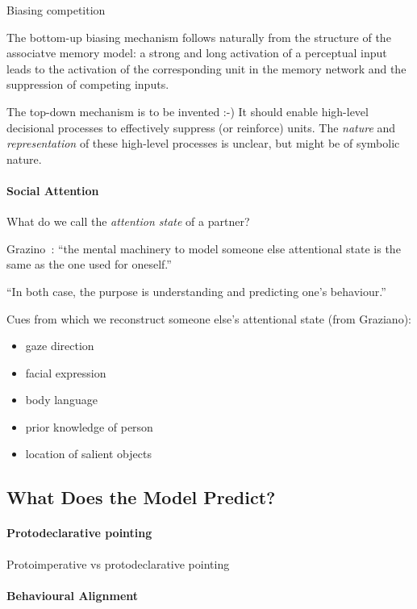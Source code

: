 \documentclass[a4paper]{article}
\begin{document}
Biasing competition~\cite{beck2009top}

The bottom-up biasing mechanism follows naturally from the structure of the
associatve memory model: a strong and long activation of a perceptual input
leads to the activation of the corresponding unit in the memory network and the
suppression of competing inputs.

The top-down mechanism is to be invented :-)
It should enable high-level decisional processes to effectively suppress (or
reinforce) units. The \emph{nature} and \emph{representation} of these
high-level processes is unclear, but might be of symbolic nature.



\paragraph{Social Attention}

What do we call the \emph{attention state} of a partner?


Grazino~\cite{graziano2013consciousness}: ``the mental machinery to model
someone else attentional state is the same as the one used for oneself.''

``In both case, the purpose is understanding and predicting one's behaviour.''

Cues from which we reconstruct someone else's attentional state (from Graziano):
\begin{itemize}
    \item gaze direction
    \item facial expression
    \item body language
    \item prior knowledge of person
    \item location of salient objects
\end{itemize}

\subsection{What Does the Model Predict?}

\paragraph{Protodeclarative pointing}

Protoimperative vs protodeclarative pointing~\cite{baron1986perceptual}

\paragraph{Behavioural Alignment}
\end{document}
